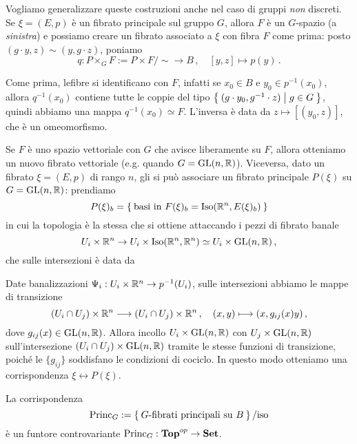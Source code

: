 Vogliamo generalizzare queste costruzioni anche nel caso di gruppi \emph{non} discreti.
Se $\xi = (E,p)$ è un fibrato principale sul gruppo $G$, allora $F$ è un $G$-spazio (a \emph{sinistra})
e possiamo creare un fibrato associato a $\xi$ con fibra $F$ come prima:
posto $(g \cdot y,z) \sim (y, g \cdot z)$, poniamo
\begin{equation*}
	q : P \times_{G} F  := P \times F/\sim \longrightarrow B\,,
	\quad {[y,z]} \longmapsto p(y)\,.
\end{equation*}

Come prima, lefibre si identificano con $F$, infatti se $x_{0} \in B$ e $y_{0} \in p^{-1}(x_{0})$,
allora $q^{-1}(x_{0})$ contiene tutte le coppie del tipo $\Set{(g \cdot y_{0},g^{-1} \cdot z) | g \in G}$,
quindi abbiamo una mappa $q^{-1}(x_{0}) \simeq F$. L'inversa è data da $z \mapsto [(y_{0},z)]$,
che è un omeomorfismo.

Se $F$ è uno spazio vettoriale con $G$ che avisce liberamente su $F$,
allora otteniamo un nuovo fibrato vettoriale (e.g. quando $G = \mathrm{GL}(n,{\mathbb R})$).
Viceversa, dato un fibrato $\xi = (E,p)$ di rango $n$,
gli si può associare un fibrato principale $P(\xi)$ su $G=\mathrm{GL}(n,{\mathbb R})$:
prendiamo
\begin{equation*}
	P(\xi)_{b} = \Set{\text{basi in } F(\xi)_{b} = \mathrm{Iso}({\mathbb R}^{n},E(\xi)_{b})}
\end{equation*}
in cui la topologia è la stessa che si ottiene attaccando i pezzi di fibrato banale
$$U_{i} \times {\mathbb R}^{n} \to U_{i} \times \mathrm{Iso}({\mathbb R}^{n},{\mathbb R}^{n}) 
\simeq U_{i} \times \mathrm{GL}(n,{\mathbb R})\,,$$
che sulle intersezioni è data da

Date banalizzazioni $\Psi_{i}:U_{i} \times {\mathbb R}^{n} \to p^{-1}(U_{i})$,
sulle intersezioni abbiamo le mappe di transizione
\begin{equation*}
	(U_{i} \cap U_{j}) \times {\mathbb R}^{n} \longrightarrow (U_{i} \cap U_{j}) \times {\mathbb R}^{n} \,,
	\quad (x,y) \longmapsto (x, g_{ij}(x) y)\,,
\end{equation*}
dove $g_{ij}(x) \in \mathrm{GL}(n,{\mathbb R})$. Allora incollo $U_{i} \times \mathrm{GL}(n,{\mathbb R})$
con $U_{j} \times \mathrm{GL}(n,{\mathbb R})$ sull'intersezione 
$(U_{i} \cap U_{j}) \times \mathrm{GL}(n,{\mathbb R})$ tramite le stesse funzioni di transizione,
poiché le $\{g_{ij}\}$ soddisfano le condizioni di cociclo.
In questo modo otteniamo una corrispondenza $\xi \leftrightarrow P(\xi)$.

\begin{thm}
	La corrispondenza
	\begin{equation*}
		\mathrm{Princ}_{G} := \Set{G\text{-fibrati principali su } B}/\text{iso}
	\end{equation*}
	è un funtore controvariante $\mathrm{Princ}_{G}:{\normalfont\textbf{Top}}^{op} \to {\normalfont\textbf{Set}}$.
\end{thm}















